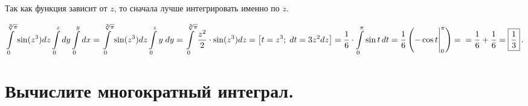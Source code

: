 \documentclass[a4paper, fleqn]{article}
\begin{document}
    Так как функция зависит от $z$, то сначала лучше интегрировать именно по $z$. 
    
    $\displaystyle \int \limits_{0}^{\sqrt[3]{\pi}} \sin (z^3) dz \int \limits_{0}^{z} dy
    \int \limits_{0}^{y} dx = 
     \int \limits_{0}^{\sqrt[3]{\pi}} \sin (z^3) dz \int \limits_{0}^{z} y \; dy = 
     \int \limits_{0}^{\sqrt[3]{\pi}}  \frac{z^2}{2} \cdot \sin (z^3) dz = \left[ t = z^3; \; dt = 3z^2dz \right] =  
     \frac{1}{6} \cdot \int \limits_{0}^{\pi}    \sin t \, dt = \frac{1}{6} \left( -\cos t \Bigg|_{0}^{\pi}\right) = \\ = \frac{1}{6} + \frac{1}{6} = \boxed{\frac{1}{3}} \, .$
    
    
    
    
    
    
    
    \section*{Вычислите многократный интеграл.}
    
    
    
    
    
    
\end{document}
